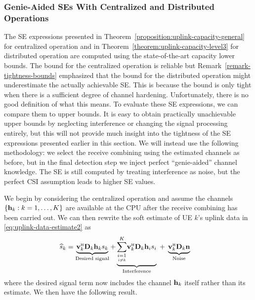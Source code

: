\subsubsection{Genie-Aided SEs With Centralized and Distributed Operations}
\label{sec:genie-aided-uplink}

The SE expressions presented in Theorem~\ref{proposition:uplink-capacity-general} for centralized operation and in Theorem~\ref{theorem:uplink-capacity-level3} for distributed operation are computed using the state-of-the-art capacity lower bounds. 
The bound for the centralized operation is reliable but Remark~\ref{remark-tightness-bounds} emphasized that the bound for the distributed operation might underestimate the actually achievable SE. This is because the bound is only tight when there is a sufficient degree of channel hardening. Unfortunately, there is no good definition of what this means. To evaluate these SE expressions, we can compare them to upper bounds. It is easy to obtain practically unachievable upper bounds by neglecting interference or changing the signal processing entirely, but this will not provide much insight into the tightness of the SE expressions presented earlier in this section.
We will instead use the following methodology: we select the receive combining using the estimated channels as before, but in the final detection step we inject perfect ``genie-aided'' channel knowledge. The SE is still computed by treating interference as noise, but the perfect CSI assumption leads to higher SE values.


We begin by considering the centralized operation and assume the channels $\{\mathbf{h}_k:k=1,\ldots,K\}$ are available at the CPU after the receive combining has been carried out. We can then rewrite the soft estimate of UE $k$'s uplink data in \eqref{eq:uplink-data-estimate2} as
\begin{align} \label{eq:uplink-data-estimate-level4-genie-aided}
\widehat{s}_k& =\underbrace{\vect{v}_k^{\Htran}\vect{D}_k{\vect{h}}_k s_k}_{\textrm{Desired signal}}+\underbrace{\condSum{i=1}{i \neq k}{K}\vect{v}_k^{\Htran}\vect{D}_k\vect{h}_i s_i}_{\textrm{Interference}}\;+\;\underbrace{\vect{v}_k^{\Htran}\vect{D}_k\vect{n}}_{\textrm{Noise}}
\end{align}
where the desired signal term now includes the channel $\mathbf{h}_k$ itself rather than its estimate. 
We then have the following result.

